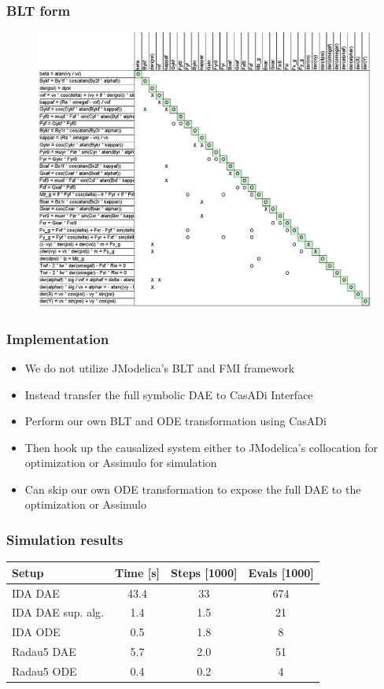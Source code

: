 \documentclass[]{beamer}
\begin{document}
\begin{frame}
\frametitle{BLT form}
\begin{figure}[ht]
\centering
\includegraphics[width=0.84\linewidth]{blt.png}
\end{figure}
\end{frame}

\begin{frame}
\frametitle{Implementation}
\begin{itemize}
\item
We do not utilize JModelica's BLT and FMI framework
\item
Instead transfer the full symbolic DAE to CasADi Interface
\item
Perform our own BLT and ODE transformation using CasADi
\item
Then hook up the causalized system either to JModelica's collocation for optimization or Assimulo for simulation
\item
Can skip our own ODE transformation to expose the full DAE to the optimization or Assimulo
\end{itemize}
\end{frame}

\begin{frame}
\frametitle{Simulation results}
\begin{table}
\centering
\begin{tabular}{lccc}
\toprule
Setup & Time [s] & Steps [1000] & Evals [1000] \\
\midrule
IDA DAE & 43.4 & 33 & 674 \\
IDA DAE sup. alg. & 1.4 & 1.5 & 21 \\
IDA ODE & 0.5 & 1.8 & 8 \\
Radau5 DAE & 5.7 & 2.0 & 51 \\
Radau5 ODE & 0.4 & 0.2 & 4 \\
\bottomrule
\end{tabular}
\end{table}
\end{frame}
\end{document}
